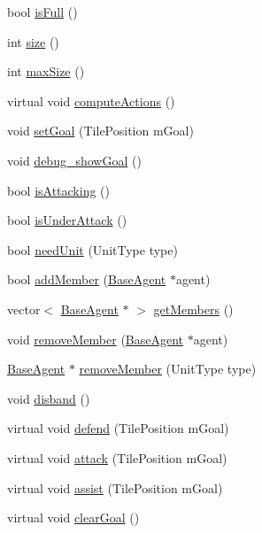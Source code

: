 \begin{DoxyCompactItemize}
\item 
bool \hyperlink{class_squad_aca71297e519ade079733e9a64871a0fe}{is\-Full} ()
\item 
int \hyperlink{class_squad_a37f8bfb71799fb9892b47afa15cf0244}{size} ()
\item 
int \hyperlink{class_squad_afe7b79c6ae91d3cf8e97f415ab656b33}{max\-Size} ()
\item 
virtual void \hyperlink{class_squad_ac338d389b81cbec76cb8d240f0833e43}{compute\-Actions} ()
\item 
void \hyperlink{class_squad_a578378fe2e823b1d5448865167d9909f}{set\-Goal} (Tile\-Position m\-Goal)
\item 
void \hyperlink{class_squad_a2888079eb1c4e57c8563c61010c3ef48}{debug\-\_\-show\-Goal} ()
\item 
bool \hyperlink{class_squad_a0d3ed017d970bbce7889b6cb3a4ffb18}{is\-Attacking} ()
\item 
bool \hyperlink{class_squad_a625a91f67527f53e31fb6aba53a91517}{is\-Under\-Attack} ()
\item 
bool \hyperlink{class_squad_a675706674e51d5092ceacaa703c582ad}{need\-Unit} (Unit\-Type type)
\item 
bool \hyperlink{class_squad_afd258866efe43f6c768513c46af71130}{add\-Member} (\hyperlink{class_base_agent}{Base\-Agent} $\ast$agent)
\item 
vector$<$ \hyperlink{class_base_agent}{Base\-Agent} $\ast$ $>$ \hyperlink{class_squad_a2b9b7f1feb60210ede502726fc920f89}{get\-Members} ()
\item 
void \hyperlink{class_squad_a37634e58c385b0afd9576a6a67f01141}{remove\-Member} (\hyperlink{class_base_agent}{Base\-Agent} $\ast$agent)
\item 
\hyperlink{class_base_agent}{Base\-Agent} $\ast$ \hyperlink{class_squad_a541ce562208ceddead65b49bda6601de}{remove\-Member} (Unit\-Type type)
\item 
void \hyperlink{class_squad_a555aa7861a2fbea3394892866ed5464c}{disband} ()
\item 
virtual void \hyperlink{class_squad_aca337f45691b4e6ea361f3f8de06c536}{defend} (Tile\-Position m\-Goal)
\item 
virtual void \hyperlink{class_squad_a4e405c83103c69dda302a367e2dfed3f}{attack} (Tile\-Position m\-Goal)
\item 
virtual void \hyperlink{class_squad_aefeccd46eb2bf673e1bb7e4d7b913a49}{assist} (Tile\-Position m\-Goal)
\item 
virtual void \hyperlink{class_squad_a54380c521be6f5b3be723c24e2bd9ab7}{clear\-Goal} ()

\end{DoxyCompactItemize}
